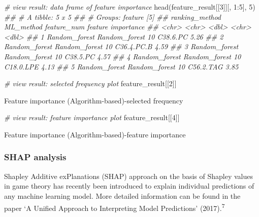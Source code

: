 \documentclass[]{article}
\newcommand{\hlnum}[1]{\textcolor[rgb]{0.816,0.125,0.439}{#1}}%
\newcommand{\hlcom}[1]{\textcolor[rgb]{0.502,0.502,0.502}{\textit{#1}}}%
\newcommand{\hlopt}[1]{\textcolor[rgb]{0,0,0}{#1}}%
\newcommand{\hlstd}[1]{\textcolor[rgb]{0.251,0.251,0.251}{#1}}%
\newcommand{\hlkwd}[1]{\textcolor[rgb]{0.878,0.439,0.125}{#1}}%
\newenvironment{Shaded}{\begin{myshaded}}{\end{myshaded}}
\newcommand{\KeywordTok}[1]{\hlkwd{#1}}
\newcommand{\DecValTok}[1]{\hlnum{#1}}
\newcommand{\CommentTok}[1]{\hlcom{#1}}
\newcommand{\OperatorTok}[1]{\hlopt{#1}}
\newcommand{\NormalTok}[1]{\hlstd{#1}}
\begin{document}
\begin{Shaded}
\begin{Highlighting}[]
\CommentTok{# view result: data frame of feature importance}
\KeywordTok{head}\NormalTok{(feature_result[[}\DecValTok{3}\NormalTok{]][, }\DecValTok{1}\OperatorTok{:}\DecValTok{5}\NormalTok{], }\DecValTok{5}\NormalTok{)}
\CommentTok{## # A tibble: 5 x 5}
\CommentTok{## # Groups:   feature [5]}
\CommentTok{##   ranking_method ML_method     feature_num feature    importance}
\CommentTok{##   <chr>          <chr>               <dbl> <chr>           <dbl>}
\CommentTok{## 1 Random_forest  Random_forest          10 C38.6.PC         5.26}
\CommentTok{## 2 Random_forest  Random_forest          10 C36.4.PC.B       4.59}
\CommentTok{## 3 Random_forest  Random_forest          10 C38.5.PC         4.57}
\CommentTok{## 4 Random_forest  Random_forest          10 C18.0.LPE        4.13}
\CommentTok{## 5 Random_forest  Random_forest          10 C56.2.TAG        3.85}
\end{Highlighting}
\end{Shaded}

\begin{Shaded}
\begin{Highlighting}[]
\CommentTok{# view result: selected frequency plot}
\NormalTok{feature_result[[}\DecValTok{2}\NormalTok{]]}
\end{Highlighting}
\end{Shaded}

\label{fig:unnamed-chunk-62}Feature importance (Algorithm-based)-selected frequency

\begin{Shaded}
\begin{Highlighting}[]
\CommentTok{# view result: feature importance plot}
\NormalTok{feature_result[[}\DecValTok{4}\NormalTok{]] }
\end{Highlighting}
\end{Shaded}

\label{fig:unnamed-chunk-63}Feature importance (Algorithm-based)-feature importance

\hypertarget{shap-analysis}{%
\subsubsection{SHAP analysis}\label{shap-analysis}}

Shapley Additive exPlanations (SHAP) approach on the basis of Shapley values in game theory has recently been introduced to explain individual predictions of any machine learning model. More detailed information can be found in the paper `A Unified Approach to Interpreting Model Predictions' (2017).\textsuperscript{7}
\end{document}
